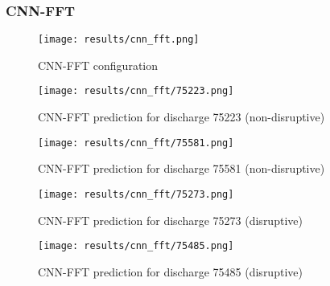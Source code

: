 \subsubsection{CNN-FFT}

\begin{figure}[H]
    \centering
    \texttt{[image: results/cnn\_fft.png]}
    \caption{CNN-FFT configuration}
    \label{fig:cnn-fft-config}
\end{figure}


\begin{figure}[H]
    \centering
    \texttt{[image: results/cnn\_fft/75223.png]}
    \caption{CNN-FFT prediction for discharge 75223 (non-disruptive)}
    \label{fig:cnn-fft-75223}
\end{figure}

\begin{figure}[H]
    \centering
    \texttt{[image: results/cnn\_fft/75581.png]}
    \caption{CNN-FFT prediction for discharge 75581 (non-disruptive)}
    \label{fig:cnn-fft-75581}
\end{figure}

\begin{figure}[H]
    \centering
    \texttt{[image: results/cnn\_fft/75273.png]}
    \caption{CNN-FFT prediction for discharge 75273 (disruptive)}
    \label{fig:cnn-fft-75273}
\end{figure}

\begin{figure}[H]
    \centering
    \texttt{[image: results/cnn\_fft/75485.png]}
    \caption{CNN-FFT prediction for discharge 75485 (disruptive)}
    \label{fig:cnn-fft-75485}
\end{figure}

